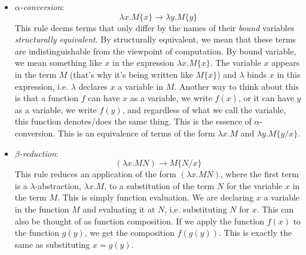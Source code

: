 \documentclass[12pt]{article}
\numberwithin{equation}{section}
\begin{document}
\begin{itemize}
\item \emph{$\alpha$-conversion}: 
\[ \lambda x. M\{ x \} \rightarrow \lambda y. M\{ y \} \]
This rule deems terms that only differ by the names of their \emph{bound} variables \emph{structurally equivalent}. By structurally equivalent, we mean that these terms are indistinguishable from the viewpoint of computation. By bound variable, we mean something like $x$ in the expression $\lambda x. M\{ x \}$. The variable $x$ appears in the term $M$ (that's why it's being written like $M\{ x \}$) and $\lambda$ binds $x$ in this expression, i.e. $\lambda$ declares $x$ a variable in $M$. Another way to think about this is that a function $f$ can have $x$ as a variable, we write $f(x)$, or it can have $y$ as a variable, we write $f(y)$, and regardless of what we call the variable, this function denotes/does the same thing. This is the essence of $\alpha$-conversion. This is an equivalence of terms of the form $\lambda x. M$ and $\lambda y. M\{ y / x\}$.


\item \emph{$\beta$-reduction}:
\[ (\lambda x. M N) \rightarrow M\{ N / x \} \]
This rule reduces an application of the form $(\lambda x. M N)$, where the first term is a $\lambda$-abstraction, $\lambda x. M$, to a substitution of the term $N$ for the variable $x$ in the term $M$. This is simply function evaluation. We are declaring $x$ a variable in the function $M$ and evaluating it at $N$, i.e. substituting $N$ for $x$. This can also be thought of as function composition. If we apply the function $f(x)$ to the function $g(y)$, we get the composition $f(g(y))$. This is exactly the same as substituting $x=g(y)$.
\end{itemize}
\end{document}
